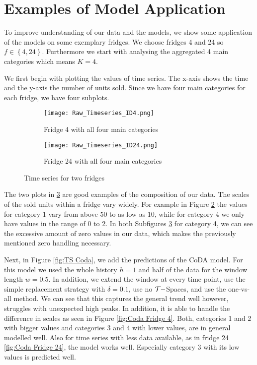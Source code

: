 \section{Examples of Model Application}
\label{sec:Examples of model application}

To improve understanding of our data and the models, we show some application of the models on some exemplary fridges. We choose fridges 4 and 24 so $f \in \left\{4,24\right\}$. Furthermore we start with analysing the aggregated 4 main categories which means $K=4$. 

We first begin with plotting the values of time series. The x-axis shows the time and the y-axis the number of units sold. Since we have four main categories for each fridge, we have four subplots. 

\begin{figure}[htb]
\centering
\begin{subfigure}[b]{0.45\textwidth}
\texttt{[image: Raw\_Timeseries\_ID4.png]} 
\caption{Fridge 4 with all four main categories}
\label{fig:TS Fridge 4}
\end{subfigure}
\hfill
\begin{subfigure}[b]{0.45\textwidth}
\texttt{[image: Raw\_Timeseries\_ID24.png]} 
\caption{Fridge 24 with all four main categories}
\label{fig:TS Fridge 24}
\end{subfigure}
\caption{Time series for two fridges}
\label{fig:TS raw}
\end{figure}

The two plots in \ref{fig:TS raw} are good examples of the composition of our data. The scales of the sold units within a fridge vary widely. For example in Figure \ref{fig:TS Fridge 24} the values for category 1 vary from above 50 to as low as 10, while for category 4 we only have values in the range of 0 to 2. In both Subfigures \ref{fig:TS raw} for category 4, we can see the excessive amount of zero values in our data, which makes the previously mentioned zero handling necessary. 

Next, in Figure \ref{fig:TS Coda}, we add the predictions of the CoDA model. For this model we used the whole history $h=1$ and half of the data for the window length $w=0.5$. In addition, we extend the window at every time point, use the simple replacement strategy with $\delta=0.1$, use no $\mathcal{T}-$Spaces, and use the one-vs-all method. We can see that this captures the general trend well however, struggles with unexpected high peaks. In addition, it is able to handle the difference in scales as seen in Figure \ref{fig:Coda Fridge 4}. Both, categories 1 and 2 with bigger values and categories 3 and 4 with lower values, are in general modelled well. Also for time series with less data available, as in fridge 24 \ref{fig:Coda Fridge 24}, the model works well. Especially category 3 with its low values is predicted well. 

